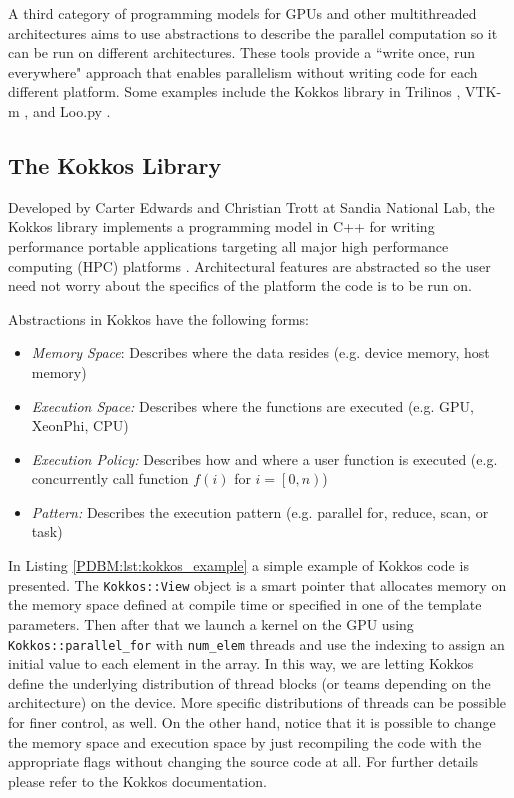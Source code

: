 \documentclass{ccr16}
\begin{document}
{{            A third category of programming models for GPUs and other multithreaded architectures aims to use abstractions to describe the parallel computation so it can be run on different architectures. These tools provide a ``write once, run everywhere" approach  that enables parallelism without writing code for each different platform. Some examples include the Kokkos library in Trilinos \cite{PDBM:Heroux05}, VTK-m \cite{PDBM:Moreland16}, and Loo.py \cite{PDBM:Kloeckner14}. 
        }

        \subsection{The Kokkos Library}
        {
            Developed by Carter Edwards and Christian Trott at Sandia National Lab, the Kokkos library implements a programming model in C++ for writing performance portable applications targeting all major high performance computing (HPC) platforms \cite{PDBM:Edwards13}. Architectural features are abstracted so the user need not worry about the specifics of the platform the code is to be run on.

            Abstractions in Kokkos have the following forms:

            \begin{itemize}
                \item \textit{Memory Space}: Describes where the data resides (e.g. device memory, host memory)

                \item \textit{Execution Space:} Describes where the functions are executed (e.g. GPU, XeonPhi, CPU)

                \item \textit{Execution Policy:} Describes how and where a user function is executed (e.g. concurrently call function $f \left ( i \right )$ for $i = \left [ 0, n \right )$)

                \item \textit{Pattern:} Describes the execution pattern (e.g. parallel for, reduce, scan, or task)
            \end{itemize}

            In Listing \ref{PDBM:lst:kokkos_example} a simple example of Kokkos code is presented. The \texttt{Kokkos::View} object is a smart pointer that allocates memory on the memory space defined at compile time or specified in one of the template parameters. Then after that we launch a kernel on the GPU using \texttt{Kokkos::parallel\_for} with \texttt{num\_elem} threads and use the indexing to assign an initial value to each element in the array. In this way, we are letting Kokkos define the underlying distribution of thread blocks (or teams depending on the architecture) on the device. More specific distributions of threads can be possible for finer control, as well. On the other hand, notice that it is possible to change the memory space and execution space by just recompiling the code with the appropriate flags without changing the source code at all. For further details please refer to the Kokkos documentation.

}}
\end{document}
